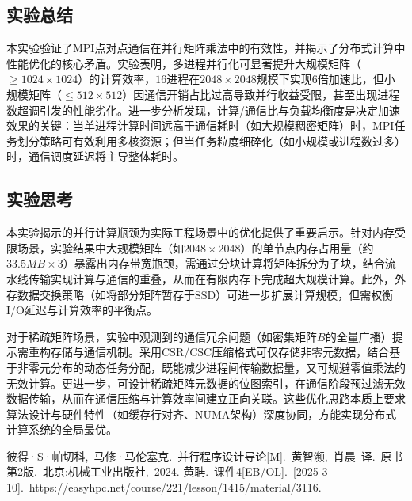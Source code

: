 \documentclass[a4paper, utf8]{ctexart}
\begin{document}
	\subsection{实验总结}
	
	本实验验证了MPI点对点通信在并行矩阵乘法中的有效性，并揭示了分布式计算中性能优化的核心矛盾。实验表明，多进程并行化可显著提升大规模矩阵（$\geq1024\times1024$）的计算效率，$16$进程在$2048\times2048$规模下实现$6$倍加速比，但小规模矩阵（$\leq512\times512$）因通信开销占比过高导致并行收益受限，甚至出现进程数超调引发的性能劣化。进一步分析发现，计算/通信比与负载均衡度是决定加速效果的关键：当单进程计算时间远高于通信耗时（如大规模稠密矩阵）时，MPI任务划分策略可有效利用多核资源；但当任务粒度细碎化（如小规模或进程数过多）时，通信调度延迟将主导整体耗时。
	
	\subsection{实验思考}
	
	本实验揭示的并行计算瓶颈为实际工程场景中的优化提供了重要启示。针对内存受限场景，实验结果中大规模矩阵（如$2048\times2048$）的单节点内存占用量（约$33.5MB\times3$）暴露出内存带宽瓶颈，需通过分块计算将矩阵拆分为子块，结合流水线传输实现计算与通信的重叠，从而在有限内存下完成超大规模计算。此外，外存数据交换策略（如将部分矩阵暂存于SSD）可进一步扩展计算规模，但需权衡I/O延迟与计算效率的平衡点。
	
	对于稀疏矩阵场景，实验中观测到的通信冗余问题（如密集矩阵$B$的全量广播）提示需重构存储与通信机制。采用CSR/CSC压缩格式可仅存储非零元数据，结合基于非零元分布的动态任务分配，既能减少进程间传输数据量，又可规避零值乘法的无效计算。更进一步，可设计稀疏矩阵元数据的位图索引，在通信阶段预过滤无效数据传输，从而在通信压缩与计算效率间建立正向关联。这些优化思路本质上要求算法设计与硬件特性（如缓存行对齐、NUMA架构）深度协同，方能实现分布式计算系统的全局最优。
	
	\let\cleardoublepage\clearpage
	
	\begin{thebibliography}{99}  
		 彼得·S·帕切科,\ 马修·马伦塞克.\ 并行程序设计导论[M].\ 黄智濒,\ 肖晨\ 译.\ 原书第2版.\ 北京:机械工业出版社,\ 2024.
		 黄聃.\ 课件4[EB/OL].\ [2025-3-10].\ https://easyhpc.net/course/221/lesson/1415/material/3116.
	\end{thebibliography}
	
\end{document}
